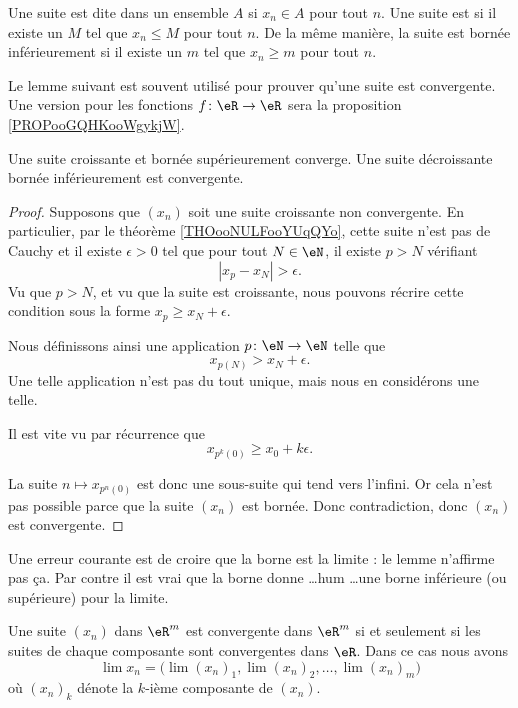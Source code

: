 Une suite est dite  dans un ensemble \( A\) si \( x_n\in A\) pour tout \( n\). Une suite est  si il existe un \( M\) tel que \( x_n\leq M\) pour tout \( n\). De la même manière, la suite est bornée inférieurement si il existe un \( m\) tel que \( x_n\geq m\) pour tout \( n\).

Le lemme suivant est souvent utilisé pour prouver qu'une suite est convergente. Une version pour les fonctions \( f\colon \eR\to \eR\) sera la proposition \ref{PROPooGQHKooWgykjW}.
\begin{lemma}       \label{LemSuiteCrBorncv}
	Une suite croissante et bornée supérieurement converge. Une suite décroissante bornée inférieurement est convergente.
\end{lemma}

\begin{proof}
	Supposons que \( (x_n)\) soit une suite croissante non convergente. En particulier, par le théorème \ref{THOooNULFooYUqQYo}, cette suite n'est pas de Cauchy et il existe \( \epsilon>0\) tel que pour tout \( N\in \eN\), il existe \( p>N\) vérifiant
	\begin{equation}
		| x_p-x_N |>\epsilon.
	\end{equation}
	Vu que \( p>N\), et vu que la suite est croissante, nous pouvons récrire cette condition sous la forme \( x_p\geq x_N+\epsilon\).

	Nous définissons ainsi une application \( p\colon \eN\to \eN\) telle que
	\begin{equation}
		x_{p(N)}>x_N+\epsilon.
	\end{equation}
	Une telle application n'est pas du tout unique, mais nous en considérons une telle.

	Il est vite vu par récurrence que
	\begin{equation}
		x_{p^k(0)}\geq x_0+k\epsilon.
	\end{equation}

	La suite \( n\mapsto x_{p^n(0)}\) est donc une sous-suite qui tend vers l'infini. Or cela n'est pas possible parce que la suite \( (x_n)\) est bornée. Donc contradiction, donc \( (x_n)\) est convergente.
\end{proof}

Une erreur courante est de croire que la borne est la limite : le lemme n'affirme pas ça. Par contre il est vrai que la borne donne \ldots hum \ldots une borne inférieure (ou supérieure) pour la limite.

\begin{proposition}     \label{PropCvRpComposante}
	Une suite \( (x_n)\) dans \( \eR^m\) est convergente dans \( \eR^m\) si et seulement si les suites de chaque composante sont convergentes dans \( \eR\). Dans ce cas nous avons
	\begin{equation}
		\lim x_n=\Big( \lim(x_n)_1,\lim (x_n)_2,\ldots,\lim (x_n)_m \Big)
	\end{equation}
	où \( (x_n)_k\) dénote la \( k\)-ième composante de \( (x_n)\).
\end{proposition}

